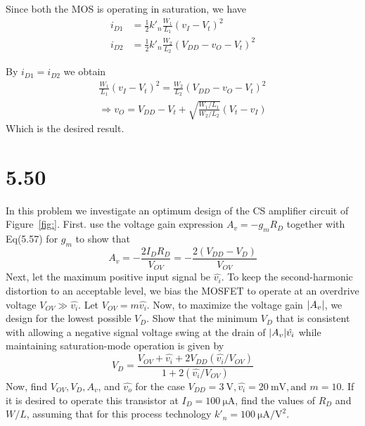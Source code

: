 \documentclass[12pt, a4paper]{article}
\begin{document}
\Ans
Since both the MOS is operating in saturation, we have
\begin{align*}
  i_{D1} &= \frac{1}{2} k'_n \frac{W_1}{L_1} (v_I - V_t)^2 \\
  i_{D2} &= \frac{1}{2} k'_n \frac{W_2}{L_2} (V_{DD} - v_O - V_t)^2 
\end{align*}

By $i_{D1} = i_{D2}$ we obtain
\begin{gather*}
  \frac{W_1}{L_1} (v_I - V_t)^2 = \frac{W_2}{L_2} (V_{DD} - v_O - V_t)^2 \\
  \Rightarrow v_O = V_{DD} - V_t + \sqrt{ \frac{W_1/L_1}{W_2/L_2} } (V_t - v_I) 
\end{gather*}
Which is the desired result.

\section{5.50}
In this problem we investigate an optimum design of the CS amplifier circuit of Figure~\ref{fig:}. First. use the voltage gain expression $A_v = -g_m R_D$ together with Eq(5.57) for $g_m$ to show that
\[ A_v = -\frac{2I_D R_D}{V_{OV}} = - \frac{2(V_{DD} - V_D)}{V_{OV}} \]
Next, let the maximum positive input signal be $\hat{v_i}$. To keep the second-harmonic distortion to an acceptable level, we bias the MOSFET to operate at an overdrive voltage $V_{OV} \gg \hat{v_i}$. Let $V_{OV} = m\hat{v_i}$. Now, to maximize the voltage gain $\lvert A_v\rvert$, we design for the lowest possible $V_D$. Show that the minimum $V_D$ that is consistent with allowing a negative signal voltage swing at the drain of $\lvert A_v\rvert\hat{v_i}$ while maintaining saturation-mode operation is given by
\[
  V_D = \frac{V_{OV} + \hat{v_i} + 2 V_{DD} (\hat{v_i}/V_{OV})}{1 + 2(\hat{v_i}/V_{OV})} 
\]
Now, find $V_{OV}, V_D, A_v$, and $\hat{v_o}$ for the case $V_{DD} = \SI{3}{\V}, \hat{v_i} = \SI{20}{\mV}, \text{and } m = 10$. If it is desired to operate this transistor at $I_D = \SI{100}{\uA}$, find the values of $R_D$ and $W/L$, assuming that for this process technology $k'_n = \SI{100}{\uA\per\V\squared}$.
\end{document}
